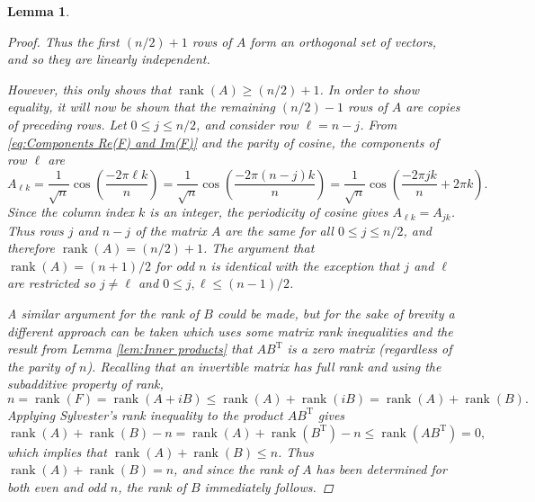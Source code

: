 \documentclass[12pt]{article}
\newcommand{\trans}{\mathrm{T}}	%
\newcommand{\rank}{\operatorname{rank}}	%
\newtheorem{lemma}{Lemma}[section]
\begin{document}
\begin{lemma}
\begin{proof}
Thus the first $(n/2)+1$ rows of $A$ form an orthogonal set of vectors, and so they are linearly independent. \par 
However, this only shows that $\rank(A) \geq (n/2)+1$. In order to show equality, it will now be shown that the remaining $(n/2)-1$ rows of $A$ are copies of preceding rows. Let $0 \leq j \leq n/2$, and consider row $\ell = n - j$. From \eqref{eq:Components Re(F) and Im(F)} and the parity of cosine, the components of row $\ell$ are
\[A_{\ell{k}} = \frac{1}{\sqrt{n}}\cos\left(\frac{-2\pi{\ell{k}}}{n}\right) = \frac{1}{\sqrt{n}}\cos\left(\frac{-2\pi{(n-j){k}}}{n}\right) = \frac{1}{\sqrt{n}}\cos\left(\frac{-2\pi{jk}}{n} + 2\pi{k}\right).\]
Since the column index $k$ is an integer, the periodicity of cosine gives $A_{\ell{k}} = A_{jk}$. Thus rows $j$ and $n-j$ of the matrix $A$ are the same for all $0 \leq j \leq n/2$, and therefore $\rank(A) = (n/2)+1$.  The argument that $\rank(A) = (n+1)/2$ for odd $n$ is identical with the exception that $j$ and $\ell$ are restricted so $j \neq \ell$ and $0 \leq j,\ell \leq (n-1)/2$. \par 
A similar argument for the rank of $B$ could be made, but for the sake of brevity a different approach can be taken which uses some matrix rank inequalities and  the result from Lemma \ref{lem:Inner products} that $AB^\trans$ is a zero matrix (regardless of the parity of $n$). Recalling that an invertible matrix has full rank and using the subadditive property of rank,
\[n = \rank(F) = \rank(A + iB) \leq \rank(A) + \rank(iB) = \rank(A) + \rank(B).\] 
Applying Sylvester's rank inequality to the product $AB^\trans$ gives
\[\rank(A) + \rank(B) - n = \rank(A) + \rank(B^\trans) - n \leq \rank(AB^\trans) = 0,\]
which implies that $\rank(A) + \rank(B) \leq n$. Thus $\rank(A) + \rank(B) = n$, and since the rank of $A$ has been determined for both even and odd $n$, the rank of $B$ immediately follows. 
\end{proof}
\end{lemma} 
\end{document}
